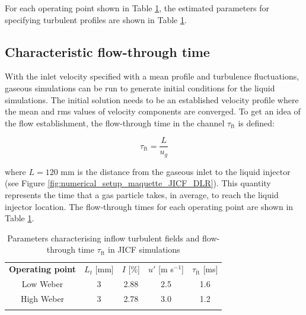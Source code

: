 For each operating point shown in Table \ref{tab:jicf_operating_conditions_turbulent_injection_parameters}, the estimated parameters for specifying turbulent profiles are shown in Table \ref{tab:jicf_operating_conditions_turbulent_injection_parameters}.


\subsection*{Characteristic flow-through time}

With the inlet velocity specified with a mean profile and turbulence fluctuations, gaseous simulations can be run to generate initial conditions for the liquid simulations. The initial solution needs to be an established velocity profile where the mean and rms values of velocity components are converged. To get an idea of the flow establishment, the flow-through time in the channel $\tau_\mathrm{ft}$ is defined:

\begin{equation}
\tau_\mathrm{ft} = \frac{L}{u_g}
\end{equation}

where $L = 120$ mm is the distance from the gaseous inlet to the liquid injector (see Figure \ref{fig:numerical_setup_maquette_JICF_DLR}). This quantity represents the time that a gas particle takes, in average, to reach the liquid injector location. The flow-through times for each operating point are shown in Table \ref{tab:jicf_operating_conditions_turbulent_injection_parameters}.

\begin{table}[!h]
\centering
\caption{Parameters characterising inflow turbulent fields and flow-through time $\tau_\mathrm{ft}$ in JICF simulations}
\begin{tabular}{ccccc}
\thickhline
\textbf{Operating point} &  $L_t$ [mm] &  $I$ [\%] & $u'$ [m s$^{-1}$] & $\tau_\mathrm{ft}$ [ms] \\ %
\thickhline
Low Weber & 3 & 2.88 & 2.5 & 1.6 \\
High Weber & 3 & 2.78 & 3.0 & 1.2  \\
\thickhline
\end{tabular}
\label{tab:jicf_operating_conditions_turbulent_injection_parameters}
\end{table}


